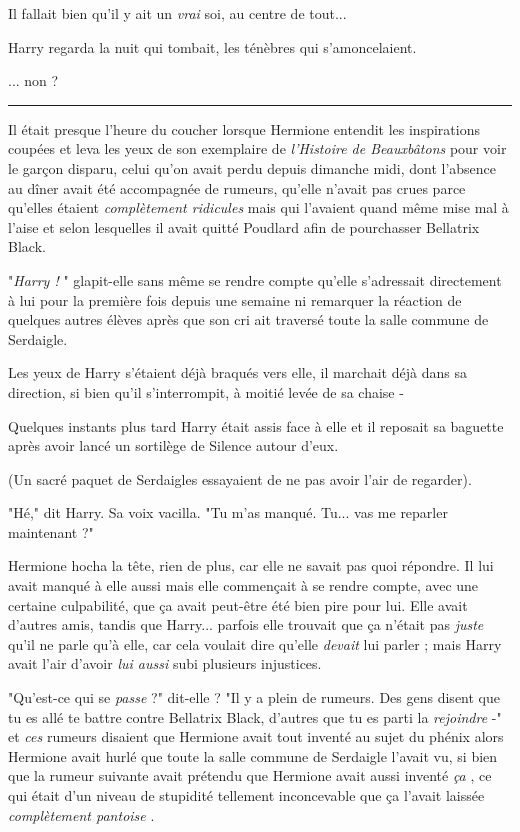 Il fallait bien qu'il y ait un \emph{vrai}  soi, au centre de tout...

Harry regarda la nuit qui tombait, les ténèbres qui s'amoncelaient.

... non ?
\par\noindent\rule{\textwidth}{0.4pt}
Il était presque l'heure du coucher lorsque Hermione entendit les inspirations coupées et leva les yeux de son exemplaire de \emph{l'Histoire de Beauxbâtons}  pour voir le garçon disparu, celui qu'on avait perdu depuis dimanche midi, dont l'absence au dîner avait été accompagnée de rumeurs, qu'elle n'avait pas crues parce qu'elles étaient \emph{complètement ridicules}  mais qui l'avaient quand même mise mal à l'aise et selon lesquelles il avait quitté Poudlard afin de pourchasser Bellatrix Black.

"\emph{Harry !} " glapit-elle sans même se rendre compte qu'elle s'adressait directement à lui pour la première fois depuis une semaine ni remarquer la réaction de quelques autres élèves après que son cri ait traversé toute la salle commune de Serdaigle.

Les yeux de Harry s'étaient déjà braqués vers elle, il marchait déjà dans sa direction, si bien qu'il s'interrompit, à moitié levée de sa chaise -

Quelques instants plus tard Harry était assis face à elle et il reposait sa baguette après avoir lancé un sortilège de Silence autour d'eux.

(Un sacré paquet de Serdaigles essayaient de ne pas avoir l'air de regarder).

"Hé," dit Harry. Sa voix vacilla. "Tu m'as manqué. Tu... vas me reparler maintenant ?"

Hermione hocha la tête, rien de plus, car elle ne savait pas quoi répondre. Il lui avait manqué à elle aussi mais elle commençait à se rendre compte, avec une certaine culpabilité, que ça avait peut-être été bien pire pour lui. Elle avait d'autres amis, tandis que Harry... parfois elle trouvait que ça n'était pas \emph{juste}  qu'il ne parle qu'à elle, car cela voulait dire qu'elle \emph{devait}  lui parler ; mais Harry avait l'air d'avoir \emph{lui aussi } subi plusieurs injustices.

"Qu'est-ce qui se \emph{passe}  ?" dit-elle ? "Il y a plein de rumeurs. Des gens disent que tu es allé te battre contre Bellatrix Black, d'autres que tu es parti la \emph{rejoindre}  -" et \emph{ces}  rumeurs disaient que Hermione avait tout inventé au sujet du phénix alors Hermione avait hurlé que toute la salle commune de Serdaigle l'avait vu, si bien que la rumeur suivante avait prétendu que Hermione avait aussi inventé \emph{ça} , ce qui était d'un niveau de stupidité tellement inconcevable que ça l'avait laissée \emph{complètement pantoise} .

